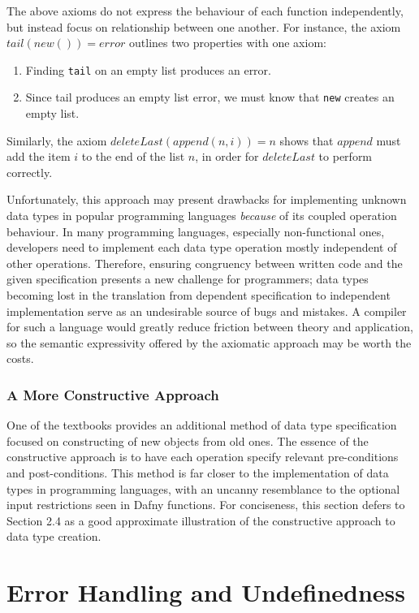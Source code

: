 \documentclass{article}
\begin{document}
The above axioms do not express the behaviour of each function independently, but instead focus on relationship between one another.
For instance, the axiom $tail(new()) = error$ outlines two properties with one axiom:
\begin{enumerate}
    \item Finding \texttt{tail} on an empty list produces an error.
    \item Since tail produces an empty list error, we must know that \texttt{new} creates an empty list.
\end{enumerate}
Similarly, the axiom $deleteLast(append(n, i)) = n$ shows that $append$ must add the item $i$
to the end of the list $n$, in order for $deleteLast$ to perform correctly.

Unfortunately, this approach may present drawbacks for implementing unknown data types in popular programming languages
\textit{because} of its coupled operation behaviour. In many programming languages, especially non-functional ones,
developers need to implement each data type operation mostly independent of other operations. Therefore, ensuring congruency
between written code and the given specification presents a new challenge for programmers;
data types becoming lost in the translation from dependent specification to independent implementation serve
as an undesirable source of bugs and mistakes. A compiler for such a language would greatly reduce friction between
theory and application, so the semantic expressivity offered by the axiomatic approach may be worth the costs.

\subsubsection{A More Constructive Approach}

One of the textbooks \cite{ADTspec} provides an additional method of data type specification focused on constructing
of new objects from old ones. The essence of the constructive approach is to have
each operation specify relevant pre-conditions and post-conditions.
This method is far closer to the implementation of data types in programming languages, with an uncanny resemblance
to the optional input restrictions seen in Dafny functions. For conciseness, this section defers to Section 2.4
as a good approximate illustration of the constructive approach to data type creation.

\section{Error Handling and Undefinedness}
\end{document}
